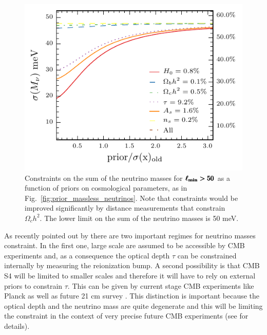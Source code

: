 \documentclass[aps,prd,reprint,superscriptaddress]{revtex4-1}
\newcommand{\reffig}[1]{Fig.~\ref{fig:#1}}
\begin{document}

\begin{figure}[htbp]
\begin{center}
\includegraphics{prior_omnuh2_snow_mass_lmin=50_lmax=3000_ndet=1000000_fsky=0_75.pdf}
\caption{Constraints on the sum of the neutrino masses for $\pmb{\ell_{\rm min}>50}$ as a function of priors on cosmological parameters, as in \reffig{prior_massless_neutrinos}.  Note that constraints would be improved significantly  by distance measurements that constrain $\Omega_ch^2$. The lower limit on the sum of the neutrino masses is 50 meV.}
\label{fig:prior_omeganuh2_tau}
\end{center}
\end{figure}
As recently pointed out by \cite{allison:2015} there are two important regimes for neutrino masses constraint. In the first one,  large scale are assumed to be accessible by CMB experiments and, as a consequence the optical depth $\tau$ can be constrained internally by measuring the reionization bump. A second possibility is that CMB S4 will be limited to smaller scales and therefore it will have to rely on external priors to constrain $\tau$. This can be given by current stage CMB experiments like Planck as well as future 21 cm survey \cite{liu:2015}. This distinction is important because the optical depth and the neutrino mass are quite degenerate and this will be limiting the constraint in the context of very precise future CMB experiments (see \cite{allison:2015} for details).
\end{document}
